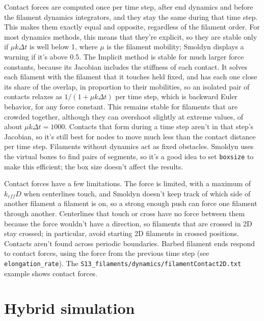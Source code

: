 \documentclass {scrbook}
\newcommand {\ttt} {\texttt}
\begin{document}
Contact forces are computed once per time step, after end dynamics and before the filament dynamics integrators, and they stay the same during that time step. This makes them exactly equal and opposite, regardless of the filament order. For most dynamics methods, this means that they're explicit, so they are stable only if $\mu k \Delta t$ is well below 1, where $\mu$ is the filament mobility; Smoldyn displays a warning if it's above 0.5. The Implicit method is stable for much larger force constants, because its Jacobian includes the stiffness of each contact. It solves each filament with the filament that it touches held fixed, and has each one close its share of the overlap, in proportion to their mobilities, so an isolated pair of contacts relaxes as $1/(1+\mu k \Delta t)$ per time step, which is backward Euler behavior, for any force constant. This remains stable for filaments that are crowded together, although they can overshoot slightly at extreme values, of about $\mu k \Delta t=1000$. Contacts that form during a time step aren't in that step's Jacobian, so it's still best for nodes to move much less than the contact distance per time step. Filaments without dynamics act as fixed obstacles. Smoldyn uses the virtual boxes to find pairs of segments, so it's a good idea to set \ttt{boxsize} to make this efficient; the box size doesn't affect the results.

Contact forces have a few limitations. The force is limited, with a maximum of $k_{eff}D$ when centerlines touch, and Smoldyn doesn't keep track of which side of another filament a filament is on, so a strong enough push can force one filament through another. Centerlines that touch or cross have no force between them because the force wouldn't have a direction, so filaments that are crossed in 2D stay crossed; in particular, avoid starting 2D filaments in crossed positions. Contacts aren't found across periodic boundaries. Barbed filament ends respond to contact forces, using the force from the previous time step (see \ttt{elongation\_rate}). The \ttt{S13\_filaments/dynamics/filamentContact2D.txt} example shows contact forces.



\chapter{Hybrid simulation}
\end{document}
